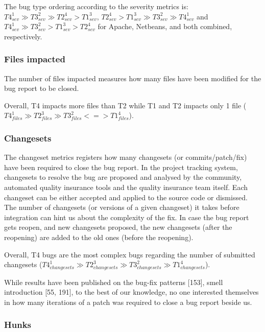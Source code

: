 \documentclass[12pt]{report}
\begin{document}
The bug type ordering according to the severity metrics is:
\(T4_{sev}^1 \gg T3_{sev}^2 \gg T2_{sev}^4 > T1_{sev}^3\),
\(T2_{sev}^4 > T1_{sev}^3 \gg T3_{sev}^2 \gg T4_{sev}^1\) and
\(T4_{sev}^1 \gg T3_{sev}^2 > T1_{sev}^3 > T2_{sev}^4\) for Apache,
Netbeans, and both combined, respectively.

\subsubsection{Files impacted}\label{files-impacted}

The number of files impacted measures how many files have been modified
for the bug report to be closed.

Overall, T4 impacts more files than T2 while T1 and T2 impacts only 1
file
(\(T4_{files}^1 \gg T2_{files}^3 \gg T3_{files}^2 < = > T1_{files}^4\)).

\subsubsection{Changesets}\label{changesets}

The changeset metrics registers how many changesets (or
commits/patch/fix) have been required to close the bug report. In the
project tracking system, changesets to resolve the bug are proposed and
analysed by the community, automated quality insurance tools and the
quality insurance team itself. Each changeset can be either accepted and
applied to the source code or dismissed. The number of changesets (or
versions of a given changeset) it takes before integration can hint us
about the complexity of the fix. In case the bug report gets reopen, and
new changesets proposed, the new changesets (after the reopening) are
added to the old ones (before the reopening).

Overall, T4 bugs are the most complex bugs regarding the number of
submitted changesets
(\(T4_{changesets}^1 \gg T2_{changesets}^3 \gg T3_{changesets}^2 \gg T1_{changesets}^4\)).

While results have been published on the bug-fix patterns {[}153{]},
smell introduction {[}55, 191{]}, to the best of our knowledge, no one
interested themselves in how many iterations of a patch was required to
close a bug report beside us.

\subsubsection{Hunks}\label{hunks}
\end{document}
